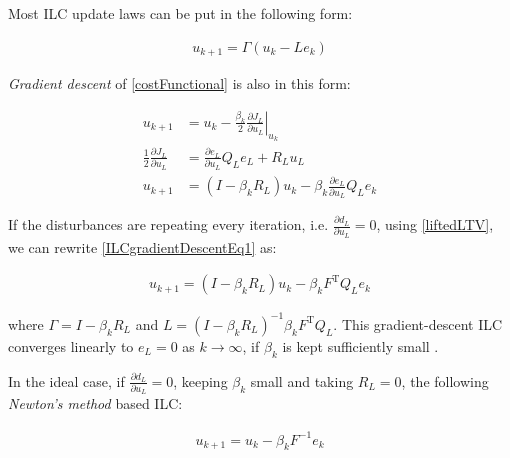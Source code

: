 \documentclass[10pt,a4paper]{article}
\newcommand\at[2]{\left.#1\right|_{#2}} %
\newcommand{\todo}{\textcolor{red}{TODO}} %
\newcommand{\error}{e} %
\newcommand{\linDist}{d} %
\newcommand{\sysInput}{u} %
\newcommand{\qmatrix}{\Gamma} %
\newcommand{\lmatrix}{L} %
\newcommand{\ValueFunction}{J}
\begin{document}
Most ILC update laws can be put in the following form:

\begin{equation}
\begin{aligned}
\sysInput_{k+1} = \qmatrix(\sysInput_{k} - \lmatrix\error_{k})
\end{aligned}
\label{ILCupdateForm}
\end{equation}

\emph{Gradient descent} of \eqref{costFunctional} is also in this form:

\begin{equation}
\begin{aligned}
\sysInput_{k+1} &= \sysInput_k - \frac{\beta_k}{2} \at{\frac{\partial{\ValueFunction_L}}{\partial{\sysInput_L}}}{\sysInput_k} \\
\frac{1}{2}\frac{\partial{\ValueFunction_L}}{\partial{\sysInput_L}} &= \frac{\partial{\error_L}}{\partial{\sysInput_L}}Q_L\error_L + R_L\sysInput_L \\
\sysInput_{k+1} &= (I - \beta_kR_L)\sysInput_k - \beta_k\frac{\partial{\error_L}}{\partial{\sysInput_L}}Q_L\error_k
\end{aligned}
\label{ILCgradientDescentEq1}
\end{equation}

If the disturbances are repeating every iteration, i.e. $\frac{\partial{\linDist_L}}{\partial{\sysInput_L}} = 0$, using \eqref{liftedLTV}, we can rewrite \eqref{ILCgradientDescentEq1} as:

\begin{equation}
\begin{aligned}
\sysInput_{k+1} = (I - \beta_kR_L)\sysInput_k - \beta_kF^\mathrm{T}Q_L\error_k
\end{aligned}
\label{ILCgradientDescentEq2}
\end{equation}

where $\qmatrix = I - \beta_kR_L$ and $\lmatrix = (I - \beta_kR_L)^{-1}\beta_kF^\mathrm{T}Q_L$. This gradient-descent ILC converges linearly to $\error_L = 0$ as $k \to \infty$, if $\beta_k$ is kept sufficiently small \cite{Nocedal99}.

In the ideal case, if $\frac{\partial{\linDist_L}}{\partial{\sysInput_L}} = 0$, keeping $\beta_k$ small and taking $R_L = 0$, the following \emph{Newton's method} based ILC:


\begin{equation}
\begin{aligned}
\sysInput_{k+1} = \sysInput_k - \beta_kF^\mathrm{-1}\error_k
\end{aligned}
\label{ILCnewtonsMethod}
\end{equation}
\end{document}
